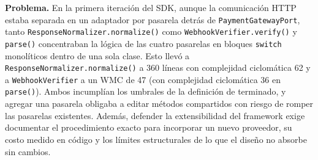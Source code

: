 \textbf{Problema.} En la primera iteración del SDK, aunque la comunicación HTTP estaba separada en un adaptador por pasarela detrás de \texttt{PaymentGatewayPort}, tanto \texttt{ResponseNormalizer.\allowbreak{}normalize()} como \texttt{WebhookVerifier.\allowbreak{}verify()} y \texttt{parse()} concentraban la lógica de las cuatro pasarelas en bloques \texttt{switch} monolíticos dentro de una sola clase. Esto llevó a \texttt{ResponseNormalizer.\allowbreak{}normalize()} a 360 líneas con complejidad ciclomática 62 y a \texttt{WebhookVerifier} a un WMC de 47 (con complejidad ciclomática 36 en \texttt{parse()}). Ambos incumplían los umbrales de la definición de terminado, y agregar una pasarela obligaba a editar métodos compartidos con riesgo de romper las pasarelas existentes. Además, defender la extensibilidad del framework exige documentar el procedimiento exacto para incorporar un nuevo proveedor, su costo medido en código y los límites estructurales de lo que el diseño no absorbe sin cambios.

